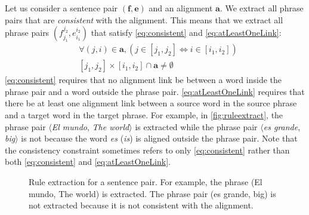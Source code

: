 Let us consider a sentence pair $(\bm{f},\bm{e})$ and an alignment $\bm{a}$.
We extract all phrase pairs that are {\em consistent} with the alignment.
This means that we extract all phrase pairs $(f_{j_1}^{j_2},e_{i_1}^{i_2})$ that
satisfy \autoref{eq:consistent} and \autoref{eq:atLeastOneLink}:
%
\begin{align}
  & \forall (j, i) \in \bm{a}, (j \in [j_1, j_2] \Leftrightarrow i \in [i_1,i_2]) \label{eq:consistent} \\
  & [j_1, j_2] \times [i_1, i_2] \cap \bm{a} \neq \emptyset \label{eq:atLeastOneLink}
\end{align}
%
\autoref{eq:consistent} requires that no alignment link be between a word
inside the phrase pair and a word outside the phrase pair.
\autoref{eq:atLeastOneLink} requires that there be at least one alignment link
between a source word in the source phrase and a target word in the target phrase.
For example, in \autoref{fig:ruleextract}, the phrase pair
$\langle$\emph{El mundo}, \emph{The world}$\rangle$ is extracted while the
phrase pair $\langle$\emph{es grande}, \emph{big}$\rangle$ is not
because the word \emph{es} (\emph{is}) is aligned
outside the phrase pair. Note that the consistency constraint
sometimes refers to only \autoref{eq:consistent} rather
than both \autoref{eq:consistent} and \autoref{eq:atLeastOneLink}.
%
\begin{figure}
  \begin{center}
  \end{center}
  \caption{Rule extraction for a sentence pair.
    For example, the phrase (El mundo, The world) is extracted.
    The phrase pair (es grande, big) is not extracted because it is
    not consistent with the alignment.}
  \label{fig:ruleextract}
\end{figure}
    
